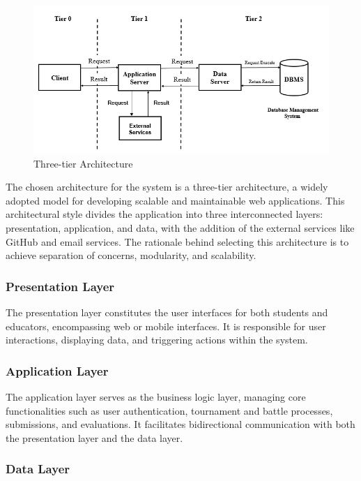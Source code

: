 \documentclass{article}
\begin{document}
\begin{figure}[H]
    \centering
    \includegraphics[width=1\textwidth]{images/3-tier-architecture.png}
    \caption{Three-tier Architecture}
    \label{fig:3-tier-architecture}
\end{figure}
The chosen architecture for the system is a three-tier architecture, a widely adopted
model for developing scalable and maintainable web applications. This architectural 
style divides the application into three interconnected layers: presentation, application, 
and data, with the addition of the external services like GitHub and email services.
The rationale behind selecting this architecture is to achieve separation of concerns, 
modularity, and scalability.

\subsubsection*{Presentation Layer}

The presentation layer constitutes the user interfaces for both students and educators, 
encompassing web or mobile interfaces. It is responsible for user interactions, 
displaying data, and triggering actions within the system.

\subsubsection*{Application Layer}

The application layer serves as the business logic layer, managing core functionalities 
such as user authentication, tournament and battle processes, submissions, and evaluations. 
It facilitates bidirectional communication with both the presentation layer and the data layer.

\subsubsection*{Data Layer}
\end{document}

